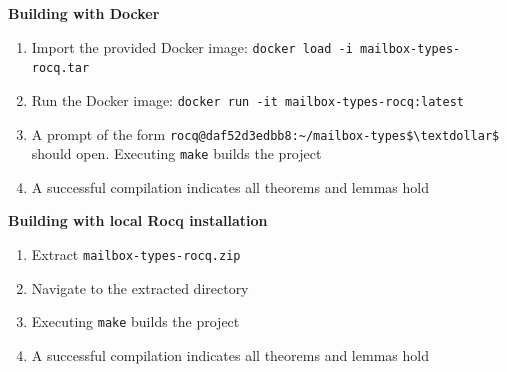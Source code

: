 \vspace{1\baselineskip}
\noindent
\textbf{Building with Docker}\\
\vspace{-0.7cm}
\begin{enumerate}
  \item Import the provided Docker image: \lstinline{docker load -i mailbox-types-rocq.tar}
  \item Run the Docker image: \lstinline{docker run -it mailbox-types-rocq:latest}
  \item A prompt of the form \lstinline{rocq@daf52d3edbb8:~/mailbox-types$\textdollar$} should open. Executing \lstinline{make} builds the project
  \item A successful compilation indicates all theorems and lemmas hold
\end{enumerate}

\noindent
\textbf{Building with local Rocq installation}\\
\vspace{-0.7cm}
\begin{enumerate}
  \item Extract \lstinline{mailbox-types-rocq.zip}
  \item Navigate to the extracted directory
  \item Executing \lstinline{make} builds the project
  \item A successful compilation indicates all theorems and lemmas hold
\end{enumerate}
